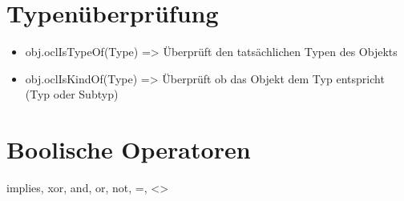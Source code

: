 \documentclass{article}
\begin{document}
\section{Typenüberprüfung}
\begin{itemize}
	\item obj.oclIsTypeOf(Type) => Überprüft den tatsächlichen Typen des Objekts
	\item obj.oclIsKindOf(Type) => Überprüft ob das Objekt dem Typ entspricht (Typ oder Subtyp)
\end{itemize}


\section{Boolische Operatoren}
implies, xor, and, or, not, =, <>
\end{document}
